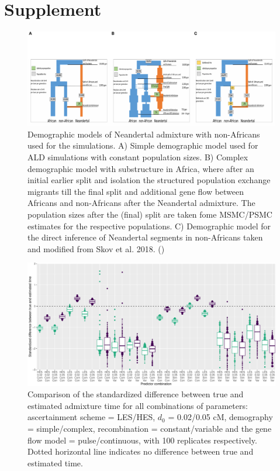 \documentclass[]{article}
\begin{document}
\hypertarget{refs}{}




\pagebreak
\setcounter{figure}{0} \renewcommand{\figurename}{Fig. S}
\renewcommand{\tablename}{Tab. S}

\section{Supplement}\label{supplement}

\begin{figure}
\centering
\includegraphics{Admixture_Time_Inference_Paper_Draft_files/figure-latex/figS1-1.pdf}
\caption{\label{fig:figS1} Demographic models of Neandertal admixture with non-Africans used for the simulations. A) Simple demographic model used for ALD simulations with constant population sizes. B) Complex demographic model with substructure in Africa, where after an initial earlier split and isolation the structured population exchange migrants till the final split and additional gene flow between Africans and non-Africans after the Neandertal admixture. The  population sizes after the (final) split are taken fome MSMC/PSMC estimates for the respective populations. C) Demographic model for the direct inference of Neandertal segments in non-Africans taken and modified from Skov et al. 2018. (\citep{skov_detecting_2018})}
\end{figure}

\begin{figure}
\centering
\includegraphics{Admixture_Time_Inference_Paper_Draft_files/figure-latex/figS2-1.pdf}
\caption{\label{fig:figS2} Comparison of the standardized difference between true and estimated admixture time for all combinations of parameters: ascertainment scheme = LES/HES,  $d_{0}$ = 0.02/0.05 cM, demography = simple/complex, recombination = constant/variable and the gene flow model = pulse/continuous, with 100 replicates respectively. Dotted horizontal line indicates no difference between true and estimated time.}
\end{figure}
\end{document}
